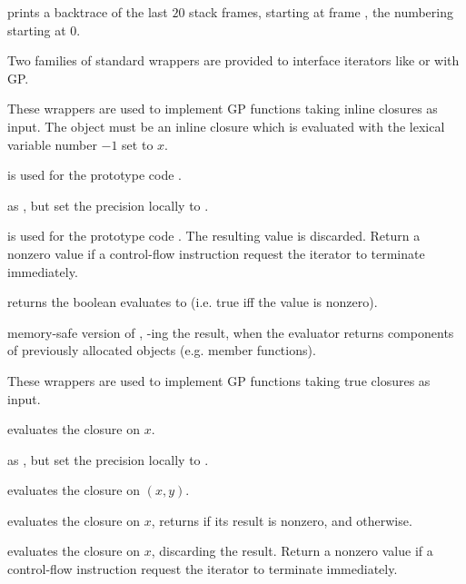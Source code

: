  prints a backtrace of the last $20$ stack
frames, starting at frame , the numbering starting at $0$.

Two families of standard wrappers are provided to interface iterators like
 or  with GP.

These wrappers are used to implement GP functions taking inline closures as
input. The object  must be an inline closure which is evaluated
with the lexical variable number $-1$ set to $x$.

 is used for the prototype code .

 as , but
set the precision locally to .

 is used for the prototype code
. The resulting value is discarded.  Return a nonzero value if a
control-flow instruction request the iterator to terminate immediately.

 returns the boolean
 evaluates to (i.e. true iff the value is nonzero).

 memory-safe version of ,
-ing the result, when the evaluator returns components of
previously allocated objects (e.g. member functions).

These wrappers are used to implement GP functions taking true closures as
input.

 evaluates the closure  on $x$.

 as ,
but set the precision locally to .

 evaluates the closure 
on $(x,y)$.

 evaluates the closure  on
$x$, returns  if its result is nonzero, and  otherwise.

 evaluates the closure  on
$x$, discarding the result. Return a nonzero value if a control-flow
instruction request the iterator to terminate immediately.

